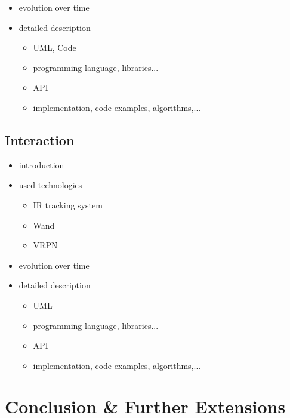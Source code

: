 \documentclass[conference]{acmsiggraph}
\begin{document}
\begin{itemize}
{\begin{itemize}
{		
	}
	\end{itemize}
}
\item evolution over time
\item{
	detailed description
	\begin{itemize}
	\item UML, Code
	\item programming language, libraries...
	\item API
	\item implementation, code examples, algorithms,...
	\end{itemize}
}
\end{itemize}






\subsection{Interaction}
\begin{itemize}
\item introduction
\item{ used technologies
	\begin{itemize}
	\item IR tracking system
	\item Wand
	\item VRPN
	\end{itemize}
}
\item evolution over time
\item{
	detailed description
	\begin{itemize}
	\item UML
	\item programming language, libraries...
	\item API
	\item implementation, code examples, algorithms,...
	\end{itemize}
}
\end{itemize}

\section{Conclusion \& Further Extensions}
\end{document}
